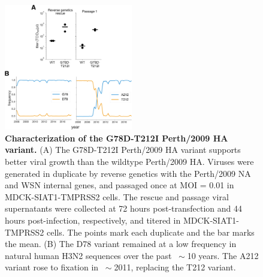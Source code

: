 \documentclass[9pt,twoside,lineno]{pnas-new}
\begin{document}
\begin{figure}
\centerline{\includegraphics[width=0.5\textwidth]{figs/supp_G78D-T212I/G78D-T212I.pdf}}
\caption{\label{suppfig:Perth2009_mut}
{\bf Characterization of the G78D-T212I Perth/2009 HA variant.}
(A)
The G78D-T212I Perth/2009 HA variant supports better viral growth than the wildtype Perth/2009 HA.
Viruses were generated in duplicate by reverse genetics with the Perth/2009 NA and WSN internal genes, and passaged once at MOI = 0.01 in MDCK-SIAT1-TMPRSS2 cells.
The rescue and passage viral supernatants were collected at 72 hours post-transfection and 44 hours post-infection, respectively, and titered in MDCK-SIAT1-TMPRSS2 cells.
The points mark each duplicate and the bar marks the mean.
(B)
The D78 variant remained at a low frequency in natural human H3N2 sequences over the past $~\sim$10 years.
The A212 variant rose to fixation in $~\sim$2011, replacing the T212 variant.
}
\end{figure}
\FloatBarrier
\end{document}

